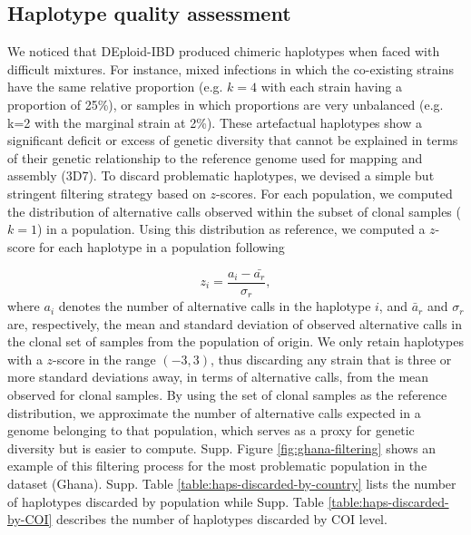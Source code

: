 \documentclass[9pt]{article}
\begin{document}


\subsection{Haplotype quality assessment}

We noticed that DEploid-IBD produced chimeric haplotypes when faced with difficult mixtures. For instance, mixed infections in which the co-existing strains have the same relative proportion (e.g. $k=4$ with each strain having a proportion of 25\%), or samples in which proportions are very unbalanced (e.g. k=2 with the marginal strain at 2\%). These artefactual haplotypes show a significant deficit or excess of genetic diversity that cannot be explained in terms of their genetic relationship to the reference genome used for mapping and assembly (3D7). To discard problematic haplotypes, we devised a simple but stringent filtering strategy based on $z$-scores. For each population, we computed the distribution of alternative calls observed within the subset of clonal samples ($k=1$) in a population. Using this distribution as reference, we computed a $z$-score for each haplotype in a population following

$$z_i = \frac{a_i - \bar{a_r}}{\sigma_r},$$ where $a_i$ denotes the number of alternative calls in the haplotype $i$, and $\bar{a}_r$ and $\sigma_r$ are, respectively, the mean and standard deviation of observed alternative calls in the clonal set of samples from the population of origin. We only retain haplotypes with a $z$-score in the range $(-3,3)$, thus discarding any strain that is three or more standard deviations away, in terms of alternative calls, from the mean observed for clonal samples. By using the set of clonal samples as the reference distribution, we approximate the number of alternative calls expected in a genome belonging to that population, which serves as a proxy for genetic diversity but is easier to compute. Supp. Figure \ref{fig:ghana-filtering} shows an example of this filtering process for the most problematic population in the dataset (Ghana). Supp. Table \ref{table:haps-discarded-by-country} lists the number of haplotypes discarded by population while Supp. Table \ref{table:haps-discarded-by-COI} describes the number of haplotypes discarded by COI level.
\end{document}
